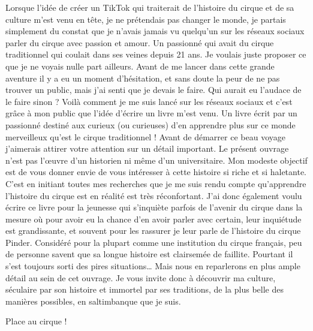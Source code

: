 Lorsque l’idée de créer un TikTok qui traiterait de l’histoire du cirque et de sa culture m’est venu en tête, je ne prétendais pas changer le monde, je partais simplement du constat que je n’avais jamais vu quelqu’un sur les réseaux sociaux parler du cirque avec passion et amour. Un passionné qui avait du cirque traditionnel qui coulait dans ses veines depuis 21 ans. Je voulais juste proposer ce que je ne voyais nulle part ailleurs. Avant de me lancer dans cette grande aventure il y a eu un moment d’hésitation, et sans doute la peur de ne pas trouver un public, mais j’ai senti que je devais le faire. Qui aurait eu l’audace de le faire sinon ? Voilà comment je me suis lancé sur les réseaux sociaux et c’est grâce à mon public que l’idée d’écrire un livre m’est venu. Un livre écrit par un passionné destiné aux curieux (ou curieuses) d’en apprendre plus sur ce monde merveilleux qu’est le cirque traditionnel ! Avant de démarrer ce beau voyage j’aimerais attirer votre attention sur un détail important. Le présent ouvrage n’est pas l’œuvre d’un historien ni même d’un universitaire. Mon modeste objectif est de vous donner envie de vous intéresser à cette histoire si riche et si haletante. C’est en initiant toutes mes recherches que je me suis rendu compte qu’apprendre l'histoire du cirque est en réalité est très réconfortant. J'ai donc également voulu écrire ce livre pour la jeunesse qui s'inquiète parfois de l'avenir du cirque dans la mesure où pour avoir eu la chance d'en avoir parler avec certain, leur inquiétude est grandissante, et souvent pour les rassurer je leur parle de l'histoire du cirque Pinder. Considéré pour la plupart comme une institution du cirque français, peu de personne savent que sa longue histoire est clairsemée de faillite. Pourtant il s'est toujours sorti des pires situations… Mais nous en reparlerons en plus ample détail au sein de cet ouvrage. Je vous invite donc à découvrir ma culture, séculaire par son histoire et immortel par ses traditions, de la plus belle des manières possibles, en saltimbanque que je suis.\\

\begin{center}
	Place au cirque ! 
\end{center}
\thispagestyle{empty} %
